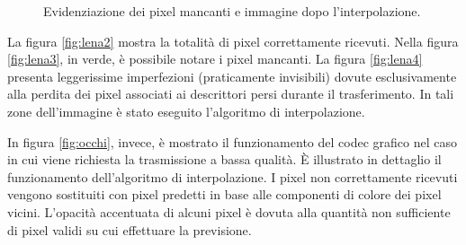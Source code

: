 \begin{figure}[b]
\centering
{}
	\caption{Evidenziazione dei pixel mancanti e immagine dopo l'interpolazione.}
\end{figure}

La figura \ref{fig:lena2} mostra la totalità di pixel correttamente
ricevuti. Nella figura \ref{fig:lena3}, in verde, è possibile notare i pixel
mancanti. La figura \ref{fig:lena4} presenta leggerissime imperfezioni
(praticamente invisibili) dovute esclusivamente alla perdita dei pixel associati ai descrittori persi durante il trasferimento. In tali zone dell'immagine è stato eseguito l'algoritmo di interpolazione.

In figura \ref{fig:occhi}, invece, è mostrato il funzionamento del codec grafico
nel caso in cui viene richiesta la trasmissione a bassa qualità. \`E illustrato
in dettaglio il funzionamento dell'algoritmo di interpolazione. I pixel non correttamente ricevuti vengono sostituiti con pixel predetti in base alle componenti di
colore dei pixel vicini. L'opacità accentuata di alcuni pixel è dovuta alla
quantità non sufficiente di pixel validi su cui effettuare la previsione.

